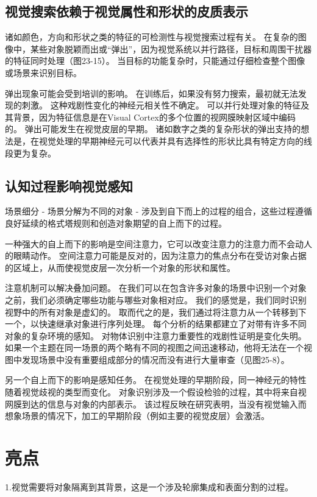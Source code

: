 \subsection{视觉搜索依赖于视觉属性和形状的皮质表示}

诸如颜色，方向和形状之类的特征的可检测性与视觉搜索过程有关。
在复杂的图像中，某些对象脱颖而出或“弹出”，因为视觉系统以并行路径，目标和周围干扰器的特征同时处理（图23-15）。 
当目标的功能复杂时，只能通过仔细检查整个图像或场景来识别目标。


弹出现象可能会受到培训的影响。
在训练后，如果没有努力搜索，最初就无法发现的刺激。 
这种戏剧性变化的神经元相关性不确定。
可以并行处理对象的特征及其背景，因为特征信息是在Visual Cortex的多个位置的视网膜映射区域中编码的。
弹出可能发生在视觉皮层的早期。
诸如数字之类的复杂形状的弹出支持的想法是，在视觉处理的早期神经元可以代表并具有选择性的形状比具有特定方向的线段更为复杂。



\subsection{认知过程影响视觉感知}
场景细分 - 场景分解为不同的对象 - 涉及到自下而上的过程的组合，这些过程遵循良好延续的格式塔规则和创造对象期望的自上而下的过程。


一种强大的自上而下的影响是空间注意力，它可以改变注意力的注意力而不会动人的眼睛动作。
空间注意力可能是反对的，因为注意力的焦点分布在受访对象占据的区域上，从而使视觉皮层一次分析一个对象的形状和属性。


注意机制可以解决叠加问题。
在我们可以在包含许多对象的场景中识别一个对象之前，我们必须确定哪些功能与哪些对象相对应。
我们的感觉是，我们同时识别视野中的所有对象是虚幻的。
取而代之的是，我们通过将注意力从一个转移到下一个，以快速继承对象进行序列处理。
每个分析的结果都建立了对带有许多不同对象的复杂环境的感知。
对物体识别中注意力重要性的戏剧性证明是变化失明。 
如果一个主题在同一场景的两个略有不同的视图之间迅速移动，他将无法在一个视图中发现场景中没有重要组成部分的情况而没有进行大量审查（见图25-8）。


另一个自上而下的影响是感知任务。
在视觉处理的早期阶段，同一神经元的特性随着视觉歧视的类型而变化。
对象识别涉及一个假设检验的过程，其中将来自视网膜到达的信息与对象的内部表示。
该过程反映在研究表明，当没有视觉输入而想象场景的情况下，加工的早期阶段（例如主要的视觉皮层）会激活。



\section{亮点}
1.视觉需要将对象隔离到其背景，这是一个涉及轮廓集成和表面分割的过程。 


